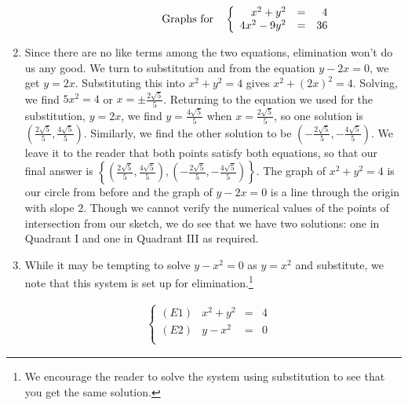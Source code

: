 \begin{ex}
\begin{enumerate}
\[\begin{array}{cc}
&

\hspace{.75in}

\text{Graphs for} \quad \left\{\begin{array}{rcr}  x^2 +y^2 & = & 4 \\ 4x^2-9y^2 & = & 36 \\ \end{array} \right. \\

\end{array} \]

\item  Since there are no like terms among the two equations, elimination won't do us any good.  We turn to substitution and from the equation $y - 2x =0$, we get $y=2x$. Substituting this into $x^2+y^2=4$ gives $x^2+(2x)^2 = 4$.  Solving, we find  $5x^2 = 4$ or $x = \pm \frac{2 \sqrt{5}}{5}$.  Returning to the equation we used for the substitution, $y = 2x$, we find $y = \frac{4 \sqrt{5}}{5}$ when $x = \frac{2 \sqrt{5}}{5}$, so one solution is $\left( \frac{2 \sqrt{5}}{5} , \frac{4 \sqrt{5}}{5} \right)$.  Similarly, we find the other solution to be  $\left( -\frac{2 \sqrt{5}}{5} , -\frac{4 \sqrt{5}}{5} \right)$.  We leave it to the reader that both points satisfy both equations, so that our final answer is $\left\{\left( \frac{2 \sqrt{5}}{5} , \frac{4 \sqrt{5}}{5} \right),  \left( -\frac{2 \sqrt{5}}{5} , -\frac{4 \sqrt{5}}{5} \right) \right\}$.  The graph of  $x^2+y^2=4$ is our circle from before and the graph of $y - 2x =0$ is a line through the origin with slope $2$.  Though we cannot verify the numerical values of the points of intersection from our sketch, we do see that we have two solutions: one in Quadrant I and one in Quadrant III as required.

\item  While it may be tempting to solve $y-x^2=0$ as $y=x^2$ and substitute, we note that this system is set up for elimination.\footnote{We encourage the reader to solve the system using substitution to see that you get the same solution.}  

\[ \begin{array}{ccc}

\left\{\begin{array}{lrcr} (E1) &  x^2 +y^2 & = & 4 \\ (E2) & y - x^2 & = & 0 \\ \end{array} \right.

&


\end{array}\]
\end{enumerate}
\end{ex}
